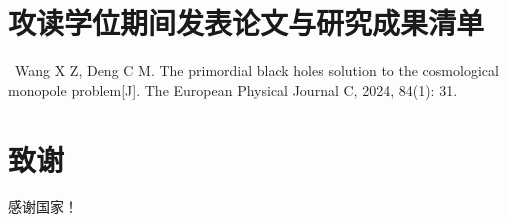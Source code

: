 \documentclass[UTF8,12pt,AutoFakeBold,fontset=fandol]{ctexart}
\begin{document}
	\section*{攻读学位期间发表论文与研究成果清单}

	\noindent[1]\ Wang X Z, Deng C M. The primordial black holes solution to the cosmological monopole problem[J]. The European Physical Journal C, 2024, 84(1): 31.
	\pagebreak
	\section*{致谢}
	\fangsong
	感谢国家！
\end{document}
